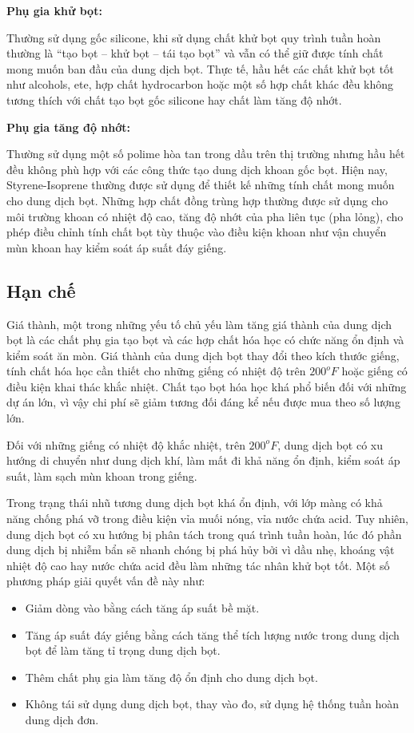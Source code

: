 \documentclass[13pt,a4paper]{article}
\begin{document}
	\textbf{Phụ gia khử bọt:}\par
	Thường sử dụng gốc silicone, khi sử dụng chất khử bọt quy trình tuần hoàn thường là “tạo bọt – khử bọt – tái tạo bọt” và vẫn có thể giữ được tính chất mong muốn ban đầu của dung dịch bọt. Thực tế, hầu hết các chất khử bọt tốt như alcohols, ete, hợp chất hydrocarbon hoặc một số hợp chất khác đều không tương thích với chất tạo bọt gốc silicone hay chất làm tăng độ nhớt.\par
	\textbf{Phụ gia tăng độ nhớt:}\par
	Thường sử dụng một số polime hòa tan trong dầu trên thị trường nhưng hầu hết đều không phù hợp với các công thức tạo dung dịch khoan gốc bọt. Hiện nay, Styrene-Isoprene thường được sử dụng để thiết kế những tính chất mong muốn cho dung dịch bọt. Những hợp chất đồng trùng hợp thường được sử dụng cho môi trường khoan có nhiệt độ cao, tăng độ nhớt của pha liên tục (pha lỏng), cho phép điều chỉnh tính chất bọt tùy thuộc vào điều kiện khoan như vận chuyển mùn khoan hay kiểm soát áp suất đáy giếng.
\subsection{Hạn chế}
	Giá thành, một trong những yếu tố chủ yếu làm tăng giá thành của dung dịch bọt là các chất phụ gia tạo bọt và các hợp chất hóa học có chức năng ổn định và kiểm soát ăn mòn. Giá thành của dung dịch bọt thay đổi theo kích thước giếng, tính chất hóa học cần thiết cho những giếng có nhiệt độ trên $200^oF$ hoặc giếng có điều kiện khai thác khắc nhiệt. Chất tạo bọt hóa học khá phổ biến đối với những dự án lớn, vì vậy chi phí sẽ giảm tương đối đáng kể nếu được mua theo số lượng lớn.\par
	Đối với những giếng có nhiệt độ khắc nhiệt, trên $200^oF$, dung dịch bọt có xu hướng di chuyển như dung dịch khí, làm mất đi khả năng ổn định, kiểm soát áp suất, làm sạch mùn khoan trong giếng.\par
	Trong trạng thái nhũ tương dung dịch bọt khá ổn định, với lớp màng có khả năng chống phá vỡ trong điều kiện vỉa muối nóng, vỉa nước chứa acid. Tuy nhiên, dung dịch bọt có xu hướng bị phân tách trong quá trình tuần hoàn, lúc đó phần dung dịch bị nhiễm bẩn sẽ nhanh chóng bị phá hủy bởi vì dầu nhẹ, khoáng vật nhiệt độ cao hay nước chứa acid đều làm những tác nhân khử bọt tốt. Một số phương pháp giải quyết vấn đề này như:
	\begin{itemize}
		\item Giảm dòng vào bằng cách tăng áp suất bề mặt.
		\item Tăng áp suất đáy giếng bằng cách tăng thể tích lượng nước trong dung  dịch bọt để làm tăng tỉ trọng dung dịch bọt.
		\item Thêm chất phụ gia làm tăng độ ổn định cho dung dịch bọt.
		\item Không tái sử dụng dung dịch bọt, thay vào đo, sử dụng hệ thống tuần hoàn dung dịch đơn.
	\end{itemize}
\end{document}

